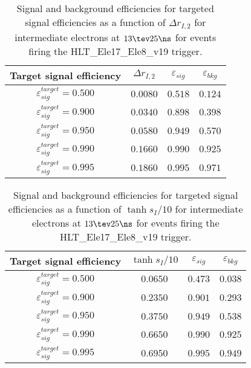 \clearpage

\begin{table}[!bht]
  \begin{center}
    \begin{tabular}{cccc}
      \hline
      Target signal efficiency & $\Delta r_{I,2}$ & $\varepsilon_{sig}$ & $\varepsilon_{bkg}$ \\ 
      \hline
      $\varepsilon_{sig}^{target} = 0.500$ & $  0.0080$ & $0.518$ & $0.124$ \\
      $\varepsilon_{sig}^{target} = 0.900$ & $  0.0340$ & $0.898$ & $0.398$ \\
      $\varepsilon_{sig}^{target} = 0.950$ & $  0.0580$ & $0.949$ & $0.570$ \\
      $\varepsilon_{sig}^{target} = 0.990$ & $  0.1660$ & $0.990$ & $0.925$ \\
      $\varepsilon_{sig}^{target} = 0.995$ & $  0.1860$ & $0.995$ & $0.971$ \\
      \hline
    \end{tabular}
    \caption{Signal and background efficiencies for targeted signal efficiencies as a function of $\Delta r_{I,2}$ for intermediate electrons at $13\tev 25\ns$ for events firing the HLT\_Ele17\_Ele8\_v19 trigger.}
    \label{tab:eff_rej_r2I_beam_13_25_trigger_17_8_I}
  \end{center}
\end{table}

\clearpage

\begin{table}[!bht]
  \begin{center}
    \begin{tabular}{cccc}
      \hline
      Target signal efficiency & $\tanh{s_I/10}$ & $\varepsilon_{sig}$ & $\varepsilon_{bkg}$ \\ 
      \hline
      $\varepsilon_{sig}^{target} = 0.500$ & $  0.0650$ & $0.473$ & $0.038$ \\
      $\varepsilon_{sig}^{target} = 0.900$ & $  0.2350$ & $0.901$ & $0.293$ \\
      $\varepsilon_{sig}^{target} = 0.950$ & $  0.3750$ & $0.949$ & $0.538$ \\
      $\varepsilon_{sig}^{target} = 0.990$ & $  0.6650$ & $0.990$ & $0.925$ \\
      $\varepsilon_{sig}^{target} = 0.995$ & $  0.6950$ & $0.995$ & $0.949$ \\
      \hline
    \end{tabular}
    \caption{Signal and background efficiencies for targeted signal efficiencies as a function of $\tanh{s_I/10}$ for intermediate electrons at $13\tev 25\ns$ for events firing the HLT\_Ele17\_Ele8\_v19 trigger.}
    \label{tab:eff_rej_sI_beam_13_25_trigger_17_8_I}
  \end{center}
\end{table}

